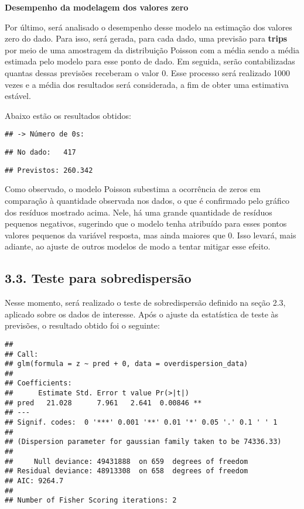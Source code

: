 \documentclass[
]{article}
\begin{document}
\textbf{Desempenho da modelagem dos valores zero}

Por último, será analisado o desempenho desse modelo na estimação dos
valores zero do dado. Para isso, será gerada, para cada dado, uma
previsão para \textbf{trips} por meio de uma amostragem da distribuição
Poisson com a média sendo a média estimada pelo modelo para esse ponto
de dado. Em seguida, serão contabilizadas quantas dessas previsões
receberam o valor 0. Esse processo será realizado 1000 vezes e a média
dos resultados será considerada, a fim de obter uma estimativa estável.

Abaixo estão os resultados obtidos:

\begin{verbatim}
## -> Número de 0s:
\end{verbatim}

\begin{verbatim}
## No dado:   417
\end{verbatim}

\begin{verbatim}
## Previstos: 260.342
\end{verbatim}

Como observado, o modelo Poisson subestima a ocorrência de zeros em
comparação à quantidade observada nos dados, o que é confirmado pelo
gráfico dos resíduos mostrado acima. Nele, há uma grande quantidade de
resíduos pequenos negativos, sugerindo que o modelo tenha atribuído para
esses pontos valores pequenos da variável resposta, mas ainda maiores
que 0. Isso levará, mais adiante, ao ajuste de outros modelos de modo a
tentar mitigar esse efeito.

\subsection{3.3. Teste para
sobredispersão}\label{teste-para-sobredispersuxe3o}

Nesse momento, será realizado o teste de sobredispersão definido na
seção 2.3, aplicado sobre os dados de interesse. Após o ajuste da
estatística de teste às previsões, o resultado obtido foi o seguinte:

\begin{verbatim}
## 
## Call:
## glm(formula = z ~ pred + 0, data = overdispersion_data)
## 
## Coefficients:
##      Estimate Std. Error t value Pr(>|t|)   
## pred   21.028      7.961   2.641  0.00846 **
## ---
## Signif. codes:  0 '***' 0.001 '**' 0.01 '*' 0.05 '.' 0.1 ' ' 1
## 
## (Dispersion parameter for gaussian family taken to be 74336.33)
## 
##     Null deviance: 49431888  on 659  degrees of freedom
## Residual deviance: 48913308  on 658  degrees of freedom
## AIC: 9264.7
## 
## Number of Fisher Scoring iterations: 2
\end{verbatim}
\end{document}
